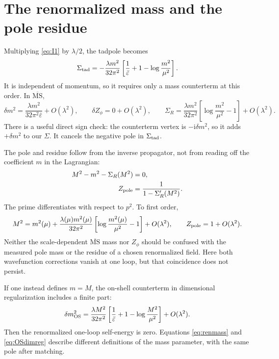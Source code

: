 \documentclass[11pt]{article}
\newcommand{\ii}{\mathrm i}
\newcommand{\eps}{\varepsilon}
\newcommand{\MSbar}{\overline{\mathrm{MS}}}
\newcommand{\module}[1]{\clearpage\section{#1}}
\begin{document}
\module{The renormalized mass and the pole residue}
Multiplying \eqref{eq:I1} by \(\lambda/2\), the tadpole becomes
\begin{equation}
 \Sigma_{\rm tad}=-\frac{\lambda m^2}{32\pi^2}
 \left[\frac1{\bar\eps}+1-\log\frac{m^2}{\mu^2}\right].
\end{equation}
It is independent of momentum, so it requires only a mass counterterm
at this order. In \(\MSbar\),
\begin{equation}
 \delta m^2=\frac{\lambda m^2}{32\pi^2\bar\eps}+O(\lambda^2),
 \qquad \delta Z_\phi=0+O(\lambda^2),\qquad
 \Sigma_R=\frac{\lambda m^2}{32\pi^2}
 \left[\log\frac{m^2}{\mu^2}-1\right]+O(\lambda^2).
 \label{eq:renmass}
\end{equation}
There is a useful direct sign check: the counterterm vertex is
\(-\ii\delta m^2\), so it adds \(+\delta m^2\) to our \(\Sigma\).
It cancels the negative pole in \(\Sigma_{\rm tad}\).

The pole and residue follow from the inverse propagator, not from
reading off the coefficient \(m\) in the Lagrangian:
\begin{align}
 M^2-m^2-\Sigma_R(M^2)&=0,                         \label{eq:polemass}\\
 Z_{\rm pole}&=\frac{1}{1-\Sigma_R'(M^2)}.         \label{eq:residue}
\end{align}
The prime differentiates with respect to \(p^2\). To first order,
\begin{equation}
 M^2=m^2(\mu)+\frac{\lambda(\mu)m^2(\mu)}{32\pi^2}
 \left[\log\frac{m^2(\mu)}{\mu^2}-1\right]+O(\lambda^2),
 \qquad Z_{\rm pole}=1+O(\lambda^2).              \label{eq:Mmass}
\end{equation}
Neither the scale-dependent \(\MSbar\) mass nor \(Z_\phi\) should be
confused with the measured pole mass or the residue of a chosen
renormalized field. Here both wavefunction corrections vanish at one
loop, but that coincidence does not persist.

If one instead defines \(m=M\), the on-shell counterterm in dimensional
regularization includes a finite part:
\begin{equation}
 \delta m^2_{\rm OS}=\frac{\lambda M^2}{32\pi^2}
 \left[\frac1{\bar\eps}+1-\log\frac{M^2}{\mu^2}\right]
 +O(\lambda^2).                                  \label{eq:OSdimreg}
\end{equation}
Then the renormalized one-loop self-energy is zero. Equations
\eqref{eq:renmass} and \eqref{eq:OSdimreg} describe different definitions
of the mass parameter, with the same pole after matching.
\end{document}
